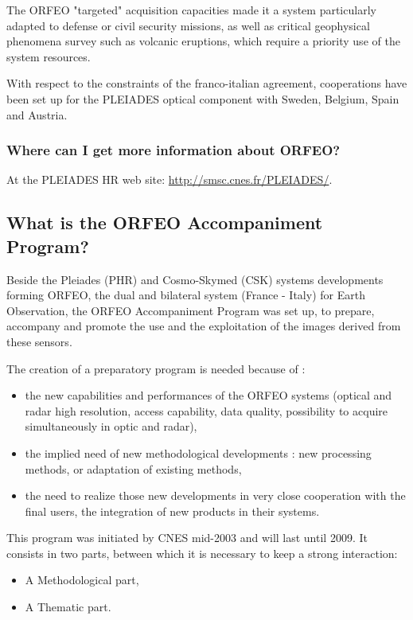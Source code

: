 The ORFEO "targeted" acquisition capacities made it a system
particularly adapted to defense or civil security missions, as well as
critical geophysical phenomena survey such as volcanic eruptions,
which require a priority use of the system resources.


With respect to the constraints of the franco-italian agreement,
cooperations have been set up for the PLEIADES optical component with
Sweden, Belgium, Spain and Austria.

\subsubsection{Where can I get more information about ORFEO?}
At the PLEIADES HR web site: \url{http://smsc.cnes.fr/PLEIADES/}.

\subsection{What is the ORFEO Accompaniment Program?}
Beside the Pleiades (PHR) and Cosmo-Skymed (CSK) systems developments forming ORFEO, the dual and bilateral system (France - Italy) for Earth Observation, the ORFEO Accompaniment Program was set up, to prepare, accompany and promote the use and the exploitation of the images derived from these sensors.

The creation of a preparatory program is needed because of :
\begin{itemize}
  \item  the new capabilities and performances of the ORFEO systems (optical and radar high resolution, access capability, data quality, possibility to acquire simultaneously in optic and radar),
  \item the implied need of new methodological developments : new processing methods, or adaptation of existing methods,
  \item the need to realize those new developments in very close cooperation with the final users, the integration of new products in their systems.
\end{itemize}
  

This program was initiated by CNES mid-2003 and will last until 2009.
It consists in two parts, between which it is necessary to keep a strong interaction:
\begin{itemize}
\item A Methodological part,
\item A Thematic part.
\end{itemize}


